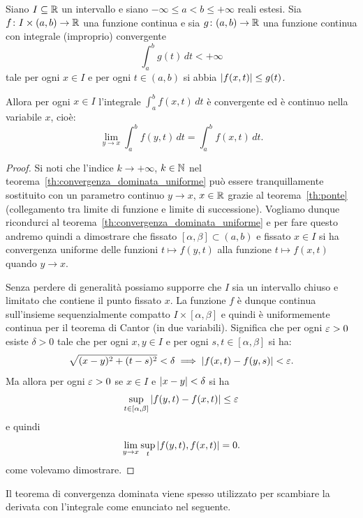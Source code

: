 \begin{theorem}
  \label{th:convergenza_dominata}%
  \mymark{**}%
Siano $I\subseteq {\mathbb R}$ un intervallo e siano 
$-\infty \le a < b \le +\infty$ reali estesi.
Sia $f\colon I \times(a,b)\to {\mathbb R}$ una funzione continua 
e sia $g\colon(a,b)\to {\mathbb R}$ una funzione continua con integrale 
(improprio) convergente
\[
 \int_a^b g(t)\, dt < +\infty
\]
tale per ogni $x\in I$ e per ogni $t\in(a,b)$ si abbia ${\left|f(x,t)\right|} \le g(t)$.

Allora per ogni $x\in I$ l'integrale $\int_a^b f(x,t)\, dt$ è convergente ed è continuo 
nella variabile $x$, cioè:
\[
  \lim_{y\to x} \int_a^b f(y,t)  \, dt 
  = \int_a^b f(x,t)\, dt.
\]
\end{theorem}
%
\begin{proof}
Si noti che l'indice $k\to +\infty$, $k\in {\mathbb N}$ 
nel teorema~\ref{th:convergenza_dominata_uniforme} 
può essere tranquillamente sostituito con 
un parametro continuo $y\to x$, $x\in {\mathbb R}$
grazie al teorema~\ref{th:ponte} (collegamento tra limite 
di funzione e limite di successione).
Vogliamo dunque ricondurci al teorema~\ref{th:convergenza_dominata_uniforme} 
e per fare questo andremo quindi a dimostrare che fissato $[\alpha,\beta]\subset (a,b)$ 
e fissato $x\in I$ si ha convergenza uniforme 
delle funzioni $t\mapsto f(y,t)$ alla funzione $t\mapsto f(x,t)$
quando $y\to x$. 

Senza perdere di generalità possiamo supporre che $I$ sia un intervallo chiuso e limitato 
che contiene il punto fissato $x$. 
La funzione $f$ è dunque continua sull'insieme sequenzialmente compatto $I\times [\alpha,\beta]$ 
e quindi è uniformemente continua
per il teorema di Cantor (in due variabili).
Significa che per ogni $\varepsilon>0$ esiste $\delta>0$ tale che per ogni $x,y\in I$ 
e per ogni $s,t\in[\alpha,\beta]$ si ha:
\[
\sqrt{(x-y)^2+(t-s)^2} < \delta \implies {\left|f(x,t)-f(y,s)\right|} < \varepsilon.  
\]
Ma allora per ogni $\varepsilon>0$ se $x\in I$ e ${\left|x-y\right|} < \delta$ si ha 
\[
  \sup_{t\in\left[\alpha,\beta\right]} {\left|f(y,t)-f(x,t)\right|} \le \varepsilon
\]
e quindi
\[
  \lim_{y\to x}  \sup_t {\left|f(y,t), f(x,t)\right|} = 0.
\]
come volevamo dimostrare.
\end{proof}
%
Il teorema di convergenza dominata viene spesso utilizzato 
per scambiare la derivata con l'integrale come enunciato nel seguente.
%

